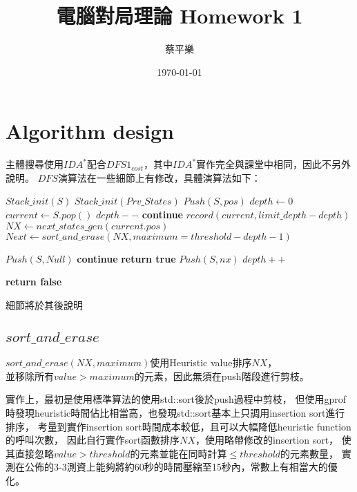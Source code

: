 \documentclass[a4paper, 12pt]{article}  %
\title{電腦對局理論 Homework 1}
\author{蔡平樂}
\date{\today}
\begin{document}
\maketitle

\section{Algorithm design}


主體搜尋使用$IDA^*$配合$DFS1_{cost}$，其中$IDA^*$實作完全與課堂中相同，因此不另外說明。
$DFS$演算法在一些細節上有修改，具體演算法如下：
\begin{algorithm}[!h]
\begin{algorithmic}
        \State$Stack\_init(S)$
        \State$Stack\_init(Prv\_States)$
        \State$Push(S, pos)$
        \State$depth \gets 0$
            \State$current\gets S.pop()$
                \State$depth--$
                \State\textbf{continue}
            \EndIf
            \State$record(current, limit\_depth - depth)$
            \State$NX \gets next\_states\_gen(current.pos)$
            \State$Next \gets sort\_and\_erase(NX, maximum = threshold - depth - 1)$
            
            \State$Push(S, Null)$
                 \textbf{continue}
                \EndIf
                 \textbf{return true}
                \EndIf
                \State$Push(S, nx)$
            \EndFor
            \State$depth++$

        \EndWhile
        \State\textbf{return false}
    \EndProcedure
\end{algorithmic}
\end{algorithm}

細節將於其後說明

\subsection{$sort\_and\_erase$}
$sort\_and\_erase(NX, maximum)$使用Heuristic value排序$NX$，\\
並移除所有$value > maximum$的元素，因此無須在push階段進行剪枝。


實作上，最初是使用標準算法的使用std::sort後於push過程中剪枝，
但使用gprof時發現heuristic時間佔比相當高，也發現std::sort基本上只調用insertion sort進行排序，
考量到實作insertion sort時間成本較低，且可以大幅降低heuristic function的呼叫次數，
因此自行實作sort函數排序$NX$，使用略帶修改的insertion sort，
使其直接忽略$value > threshold$的元素並能在同時計算$\le threshold$的元素數量，
實測在公佈的3-3測資上能夠將約60秒的時間壓縮至15秒內，常數上有相當大的優化。
\end{document}
